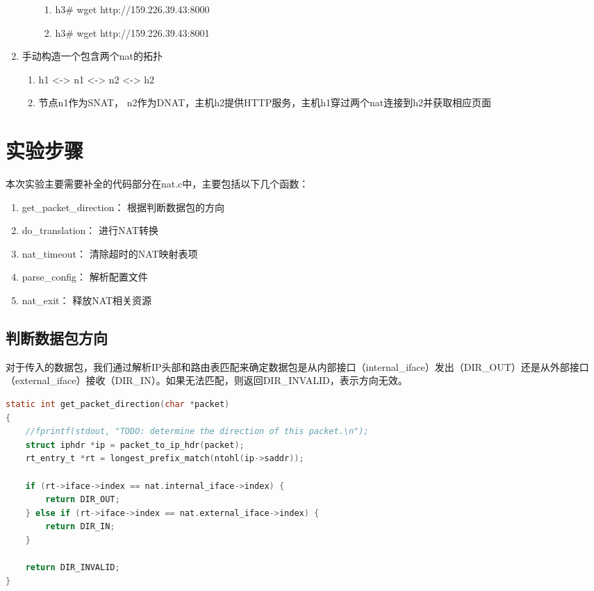 \documentclass[11pt]{article}
\begin{document}
\begin{enumerate}
\begin{enumerate}
\begin{enumerate}
            \item h3\# wget http://159.226.39.43:8000
            \item h3\# wget http://159.226.39.43:8001
        \end{enumerate}
    \end{enumerate}
    \item 手动构造一个包含两个nat的拓扑
    \begin{enumerate}
        \item h1 <-> n1 <-> n2 <-> h2
        \item 节点n1作为SNAT， n2作为DNAT，主机h2提供HTTP服务，主机h1穿过两个nat连接到h2并获取相应页面
    \end{enumerate}
\end{enumerate}

\section{实验步骤}
本次实验主要需要补全的代码部分在nat.c中，主要包括以下几个函数：
\begin{enumerate}
    \item get\_packet\_direction： 根据判断数据包的方向
    \item do\_translation： 进行NAT转换
    \item nat\_timeout： 清除超时的NAT映射表项
    \item parse\_config： 解析配置文件
    \item nat\_exit： 释放NAT相关资源
\end{enumerate}

\subsection{判断数据包方向}
对于传入的数据包，我们通过解析IP头部和路由表匹配来确定数据包是从内部接口（internal_iface）发出（DIR_OUT）还是从外部接口（external_iface）接收（DIR_IN）。如果无法匹配，则返回DIR_INVALID，表示方向无效。
\begin{lstlisting}[language=C, caption=get_packet_direction函数代码实现]
static int get_packet_direction(char *packet)
{
	//fprintf(stdout, "TODO: determine the direction of this packet.\n");
	struct iphdr *ip = packet_to_ip_hdr(packet);
	rt_entry_t *rt = longest_prefix_match(ntohl(ip->saddr));

	if (rt->iface->index == nat.internal_iface->index) {
		return DIR_OUT;
	} else if (rt->iface->index == nat.external_iface->index) {
		return DIR_IN;
	}

	return DIR_INVALID;
}
\end{lstlisting}
\end{document}
